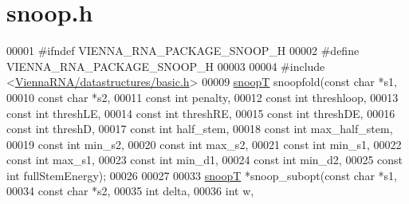 \hypertarget{snoop_8h_source}{}\section{snoop.\+h}
\label{snoop_8h_source}

\begin{DoxyCode}
00001 \textcolor{preprocessor}{#ifndef VIENNA\_RNA\_PACKAGE\_SNOOP\_H}
00002 \textcolor{preprocessor}{#define VIENNA\_RNA\_PACKAGE\_SNOOP\_H}
00003 
00004 \textcolor{preprocessor}{#include <\hyperlink{datastructures_2basic_8h}{ViennaRNA/datastructures/basic.h}>}
00009 \hyperlink{group__data__structures_structsnoopT}{snoopT} snoopfold(\textcolor{keyword}{const} \textcolor{keywordtype}{char} *s1,
00010                  \textcolor{keyword}{const} \textcolor{keywordtype}{char} *s2,
00011                  \textcolor{keyword}{const} \textcolor{keywordtype}{int}  penalty,
00012                  \textcolor{keyword}{const} \textcolor{keywordtype}{int}  threshloop,
00013                  \textcolor{keyword}{const} \textcolor{keywordtype}{int}  threshLE,
00014                  \textcolor{keyword}{const} \textcolor{keywordtype}{int}  threshRE,
00015                  \textcolor{keyword}{const} \textcolor{keywordtype}{int}  threshDE,
00016                  \textcolor{keyword}{const} \textcolor{keywordtype}{int}  threshD,
00017                  \textcolor{keyword}{const} \textcolor{keywordtype}{int}  half\_stem,
00018                  \textcolor{keyword}{const} \textcolor{keywordtype}{int}  max\_half\_stem,
00019                  \textcolor{keyword}{const} \textcolor{keywordtype}{int}  min\_s2,
00020                  \textcolor{keyword}{const} \textcolor{keywordtype}{int}  max\_s2,
00021                  \textcolor{keyword}{const} \textcolor{keywordtype}{int}  min\_s1,
00022                  \textcolor{keyword}{const} \textcolor{keywordtype}{int}  max\_s1,
00023                  \textcolor{keyword}{const} \textcolor{keywordtype}{int}  min\_d1,
00024                  \textcolor{keyword}{const} \textcolor{keywordtype}{int}  min\_d2,
00025                  \textcolor{keyword}{const} \textcolor{keywordtype}{int}  fullStemEnergy);
00026 
00027 
00033 \hyperlink{group__data__structures_structsnoopT}{snoopT} *snoop\_subopt(\textcolor{keyword}{const} \textcolor{keywordtype}{char} *s1,
00034                      \textcolor{keyword}{const} \textcolor{keywordtype}{char} *s2,
00035                      \textcolor{keywordtype}{int}        delta,
00036                      \textcolor{keywordtype}{int}        w,

\end{DoxyCode}
